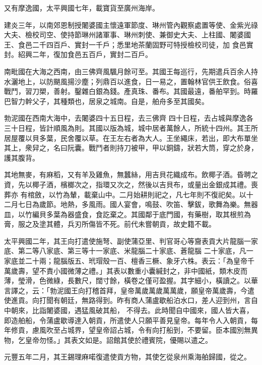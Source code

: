 \begin{pinyinscope}
 又有摩逸國，太平興國七年，載寶貨至廣州海岸。



 建炎三年，以南郊恩制授闍婆國主懷遠軍節度、琳州管內觀察處置等使、金紫光祿大夫、檢校司空、使持節琳州諸軍事、琳州刺使、兼御史大夫、上柱國、闍婆國王、食邑二千四百戶、實封一千戶；悉里地茶蘭固野可特授檢校司徒，加
 食邑實封。紹興二年，復加食邑五百戶，實封二百戶。



 南毗國在大海之西南，由三佛齊風颿月餘可至。其國王每巡行，先期遣兵百余人持水灑地上，以防颶風揚沙塵；列鼎百以進食，日一易之，置翰林官供王飲食。俗喜戰鬥，習刀槊，善射。鑿雜白銀為錢。產真珠、番布。其國最遠，番舶罕到。時羅巴智力幹父子，其種類也，居泉之城南。自是，舶舟多至其國矣。



 勃泥國在西南大海中，去闍婆四十五日程，去三佛齊
 四十日程，去占城與摩逸各三十日程，皆計順風為則。其國以版為城，城中居者萬餘人，所統十四州。其王所居屋覆以貝多葉，民舍覆以草。在王左右者為大人。王坐繩床，若出，即大布單坐其上，衆舁之，名曰阮囊。戰鬥者則持刀被甲，甲以銅鑄，狀若大筒，穿之於身，護其腹背。



 其地無麥，有麻稻，又有羊及雞魚，無蠶絲，用吉貝花織成布。飲椰子酒。昏聘之資，先以椰子酒，檳榔次之，指環又次之，然後以吉貝布，或量出金銀成其禮。喪葬亦
 有棺斂，以竹為輦，載棄山中。二月始耕則祀之，凡七年則不復祀矣。以十二月七日為歲節。地熱，多風雨。國人宴會，鳴鼓、吹笛、擊鈸，歌舞為樂。無器皿，以竹編貝多葉為器盛食，食訖棄之。其國鄰于底門國，有藥樹，取其根煎為膏，服之及塗其體，兵刃所傷皆不死。前代未嘗朝貢，故史籍不載。



 太平興國二年，其王向打遣使施弩、副使蒲亞里、判官哥心等齎表貢大片龍腦一家底、第二等八家底、第三等十一家底、米龍腦二十家底、蒼龍腦
 二十家底，凡一家底並二十兩；龍腦版五、玳瑁殼一百、檀香三橛、象牙六株。表云：「為皇帝千萬歲壽，望不責小國微薄之禮。」其表以數重小囊緘封之，非中國紙，類木皮而薄，瑩滑，色微綠，長數尺，闊寸餘，橫卷之僅可盈握。其字細小，橫讀之。以華言譯之，云：「勃泥國王向打稽首拜，皇帝萬歲萬歲萬萬歲，願皇帝萬歲壽，今遣使進貢。向打聞有朝廷，無路得到。昨有商人蒲盧歇船泊水口，差人迎到州，言自中朝來，比詣闍婆國，遇猛風破其船，
 不得去。此時聞自中國來，國人皆大喜，即造舶船，令蒲盧歇導達入朝貢，所遣使人只願平善見皇帝。每年令人入朝貢，每年修貢，慮風吹至占城界，望皇帝詔占城，令有向打船到，不要留。臣本國別無異物，乞皇帝勿怪。」其表文如是。詔館其使於禮賓院，優賜以遣之。



 元豐五年二月，其王錫理麻喏復遣使貢方物，其使乞從泉州乘海舶歸國，從之。




\end{pinyinscope}
